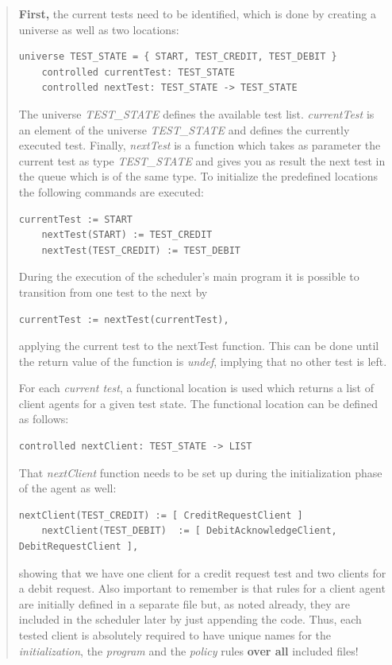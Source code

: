 \begin{quote}
\small
\textbf{First,} the current tests need to be identified, which is done by creating a universe as well as two locations:

\begin{lstlisting}[language=bsl]
	universe TEST_STATE = { START, TEST_CREDIT, TEST_DEBIT }
	controlled currentTest: TEST_STATE
	controlled nextTest: TEST_STATE -> TEST_STATE
\end{lstlisting}

The universe \textit{TEST\_STATE} defines the available test list. \textit{currentTest} is an element of the universe \textit{TEST\_STATE} and defines the currently executed test. Finally, \textit{nextTest} is a function which takes as parameter the current test as type \textit{TEST\_STATE} and gives you as result the next test in the queue which is of the same type. To initialize the predefined locations the following commands are executed:
\begin{lstlisting}[language=bsl]
	currentTest := START
	nextTest(START) := TEST_CREDIT
	nextTest(TEST_CREDIT) := TEST_DEBIT
\end{lstlisting}
During the execution of the scheduler's main program it is possible to transition from one test to the next by
\begin{lstlisting}[language=bsl]
	currentTest := nextTest(currentTest),
\end{lstlisting}
applying the current test to the nextTest function. This can be done until the return value of the function is \textit{undef}, implying that no other test is left.

For each \textit{current test}, a functional location is used which returns a list of client agents for a given test state. The functional location can be defined as follows:
\begin{lstlisting}[language=bsl]
	controlled nextClient: TEST_STATE -> LIST
\end{lstlisting}

That \textit{nextClient} function needs to be set up during the initialization phase of the agent as well:
\begin{lstlisting}[language=bsl]
	nextClient(TEST_CREDIT) := [ CreditRequestClient ]
	nextClient(TEST_DEBIT)  := [ DebitAcknowledgeClient, DebitRequestClient ],
\end{lstlisting}
showing that we have one client for a credit request test and two clients for a debit request. Also important to remember is that rules for a client agent are initially defined in a separate file but, as noted already, they are included in the scheduler later by just appending the code. Thus, each tested client is absolutely required to have unique names for the \textit{initialization}, the \textit{program} and the \textit{policy} rules \textbf{over all} included files!


\end{quote}
